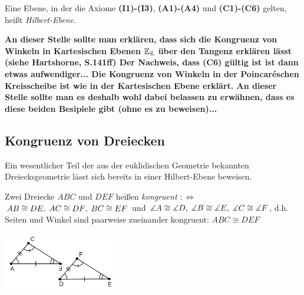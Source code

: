 \begin{defi}
Eine Ebene, in der die Axiome {\bf (I1)-(I3)}, {\bf (A1)-(A4)} und
{\bf (C1)-(C6)} gelten, hei{\ss}t {\em Hilbert-Ebene}.
\end{defi}





{\bf An dieser Stelle sollte man erklären, dass sich die Kongruenz von
  Winkeln in Kartesischen Ebenen $\mathbb E_{\mathbb K}$ über den Tangenz erklären
  lässt (siehe Hartshorne, S.141ff) Der Nachweis, dass (C6) gültig ist
  ist dann etwas aufwendiger... Die Kongruenz von Winkeln in der 
  Poincar\'eschen Kreisscheibe ist wie in der Kartesischen Ebene
  erklärt. An dieser Stelle sollte man es deshalb wohl dabei belassen
  zu erwähnen, dass es diese beiden Besipiele gibt (ohne es zu beweisen)...}





\subsection*{Kongruenz von Dreiecken}


Ein wesentlicher Teil der aus der euklidischen Geometrie bekannten
Dreiecksgeometrie l\"{a}sst sich bereits in einer Hilbert-Ebene
beweisen.




\begin{defi}
  Zwei Dreiecke $ABC$ und
    $DEF$ hei{\ss}en {\em kongruent}  $:\Longleftrightarrow$\\
    ${AB}\cong{DE},\;{AC}\cong{DF},\;{BC}\cong{EF}$
    und
    $\mbox{$\measuredangle$}{A}\cong\mbox{$\measuredangle$}{D},\;\mbox{$\measuredangle$}{B}\cong\mbox{$\measuredangle$}{E},\;\mbox{$\measuredangle$}{C}\cong\mbox{$\measuredangle$}{F}$,
    d.h. Seiten und Winkel sind paarweise zueinander kongruent:
    $ABC \cong DEF$
 \end{defi}



\centerline{\includegraphics[width=5cm]{BILDER/1-2-09-Kongruenz.png}}




